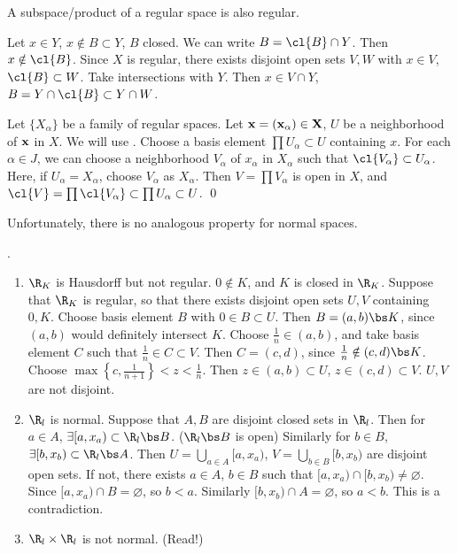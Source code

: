  A subspace/product of a regular space is also regular.

\pf
{} Let \(x \in Y\), \(x \notin B \subset Y\), \(B\) closed. We can write \(B = \cl{B} \cap Y\). Then \(x \notin \cl{B}\). Since \(X\) is regular, there exists disjoint open sets \(V, W\) with \(x \in V\), \(\cl{B} \subset W\). Take intersections with \(Y\). Then \(x \in V \cap Y\), \(B = Y \cap \cl{B} \subset Y \cap W\).

 Let \(\{X_\alpha\}\) be a family of regular spaces. Let \(\bf{x} = (x_\alpha) \in X\), \(U\) be a neighborhood of \(\bf{x}\) in \(X\). We will use . Choose a basis element \(\prod U_\alpha \subset U\) containing \(x\). For each \(\alpha \in J\), we can choose a neighborhood \(V_\alpha\) of \(x_\alpha\) in \(X_\alpha\) such that \(\cl{V_\alpha} \subset U_\alpha\). Here, if \(U_\alpha = X_\alpha\), choose \(V_\alpha\) as \(X_\alpha\). Then \(V = \prod V_\alpha\) is open in \(X\), and \(\cl{V} = \prod \cl{V_\alpha} \subset \prod U_\alpha \subset U\). \qed

\rmk Unfortunately, there is no analogous property for normal spaces.

\ex.
\begin{enumerate}
    \item \(\R_K\) is Hausdorff but not regular. \(0 \notin K\), and \(K\) is closed in \(\R_K\). Suppose that \(\R_K\) is regular, so that there exists disjoint open sets \(U, V\) containing \(0, K\). Choose basis element \(B\) with \(0 \in B \subset U\). Then \(B = (a, b) \bs K\), since \((a, b)\) would definitely intersect \(K\). Choose \(\frac{1}{n} \in (a, b)\), and take basis element \(C\) such that \(\frac{1}{n} \in C \subset V\). Then \(C = (c, d)\), since \(\frac{1}{n} \notin (c, d) \bs K\). Choose \(\max\left\{c, \frac{1}{n+1}\right\} < z < \frac{1}{n}\). Then \(z \in (a, b) \subset U\), \(z \in (c, d) \subset V\). \(U, V\) are not disjoint.

    \item \(\R_l\) is normal. Suppose that \(A, B\) are disjoint closed sets in \(\R_l\). Then for \(a \in A\), \(\exists [a, x_a) \subset \R_l \bs B\). (\(\R_l \bs B\) is open) Similarly for \(b\in B\), \(\exists [b, x_b) \subset \R_l \bs A\). Then \(U = \bigcup_{a \in A} [a, x_a)\), \(V = \bigcup_{b \in B} [b, x_b)\) are disjoint open sets. If not, there exists \(a \in A\), \(b\in B\) such that \([a, x_a) \cap [b, x_b) \neq \varnothing\). Since \([a, x_a) \cap B = \varnothing\), so \(b < a\). Similarly \([b, x_b) \cap A = \varnothing\), so \(a < b\). This is a contradiction.
    \item \(\R_l \times \R_l\) is not normal. (Read!)
\end{enumerate}

